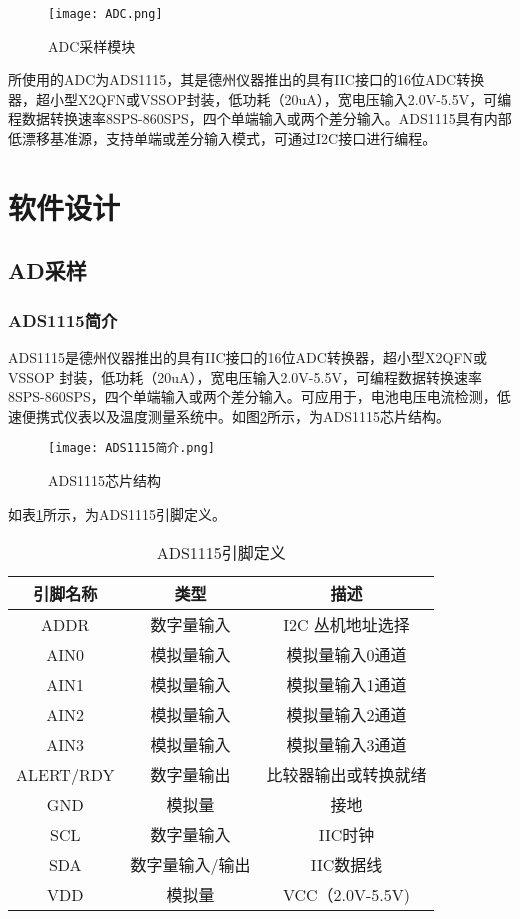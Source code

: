 \documentclass[lang=cn,11pt,a4paper]{elegantpaper}
\begin{document}
\begin{figure}[!htb]
  \centering
  \texttt{[image: ADC.png]}
  \caption{ADC采样模块}
  \label{fig:adc_sampling}
\end{figure}

所使用的ADC为ADS1115，其是德州仪器推出的具有IIC接口的16位ADC转换器，超小型X2QFN或VSSOP封装，低功耗（20uA），宽电压输入2.0V-5.5V，可编程数据转换速率8SPS-860SPS，四个单端输入或两个差分输入。ADS1115具有内部低漂移基准源，支持单端或差分输入模式，可通过I2C接口进行编程。


\section{软件设计}

\subsection{AD采样}
\subsubsection{ADS1115简介}
ADS1115是德州仪器推出的具有IIC接口的16位ADC转换器，超小型X2QFN或VSSOP 封装，低功耗（20uA），宽电压输入2.0V-5.5V，可编程数据转换速率8SPS-860SPS，四个单端输入或两个差分输入。可应用于，电池电压电流检测，低速便携式仪表以及温度测量系统中。如图\ref{fig:ADS1115芯片结构}所示，为ADS1115芯片结构。
\begin{figure}[!htb]
  \centering
  \texttt{[image: ADS1115简介.png]}
  \caption{ADS1115芯片结构}
  \label{fig:ADS1115芯片结构}
\end{figure}

如表\ref{tab:ADS1115引脚定义}所示，为ADS1115引脚定义。

\begin{table}[!ht]
  \centering
  \caption{ADS1115引脚定义}
  \begin{tabular}{ccc}
    \textbf{引脚名称} & \textbf{类型} & \textbf{描述 }   \\ \hline
    ADDR          & 数字量输入       & I2C 丛机地址选择     \\
    AIN0          & 模拟量输入       & 模拟量输入0通道       \\
    AIN1          & 模拟量输入       & 模拟量输入1通道       \\
    AIN2          & 模拟量输入       & 模拟量输入2通道       \\
    AIN3          & 模拟量输入       & 模拟量输入3通道       \\
    ALERT/RDY     & 数字量输出       & 比较器输出或转换就绪     \\
    GND           & 模拟量         & 接地             \\
    SCL           & 数字量输入       & IIC时钟          \\
    SDA           & 数字量输入/输出    & IIC数据线         \\
    VDD           & 模拟量         & VCC（2.0V-5.5V) \\
  \end{tabular}
  \label{tab:ADS1115引脚定义}
\end{table}
\end{document}
